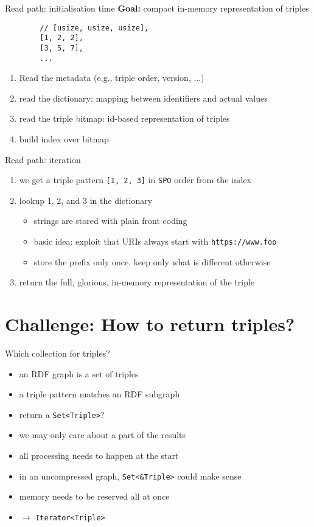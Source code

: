 \documentclass[14pt,aspectratio=169]{beamer}
\newcommand\con{\item[$-$]}
\begin{document}
\begin{frame}[fragile]{Read path: initialisation time}
    \textbf{Goal:} compact in-memory representation of triples
    \begin{verbatim}
        // [usize, usize, usize],
        [1, 2, 2],
        [3, 5, 7],
        ...
    \end{verbatim}
    \begin{enumerate}
        \item Read the metadata (e.g., triple order, version, ...)
        \item read the dictionary: mapping between identifiers and actual values
        \item read the triple bitmap: id-based representation of triples
        \item build index over bitmap
    \end{enumerate}
\end{frame}

\begin{frame}{Read path: iteration}
    \begin{enumerate}
        \item we get a triple pattern \texttt{[1, 2, 3]} in \texttt{SPO} order from the index
        \item lookup 1, 2, and 3 in the dictionary
            \begin{itemize}
                \item strings are stored with plain front coding
                \item basic idea: exploit that URIs always start with \texttt{https://www.foo}
                \item store the prefix only once, keep only what is different otherwise
            \end{itemize}
        \item return the full, glorious, in-memory representation of the triple
    \end{enumerate}
\end{frame}

\section{Challenge: How to return triples?}
\begin{frame}{Which collection for triples?}
\begin{itemize}
\item an RDF graph is a set of triples
\item a triple pattern matches an RDF subgraph
\item return a \texttt{Set<Triple>}?
\pause
\con we may only care about a part of the results
\con all processing needs to happen at the start
\item in an uncompressed graph, \texttt{Set<\&Triple>} could make sense
\con memory needs to be reserved all at once
\item $\rightarrow$ \texttt{Iterator<Triple>}
\end{itemize}
\end{frame}
\end{document}
